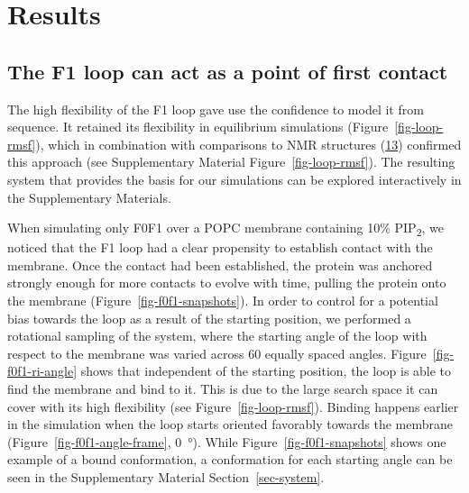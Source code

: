\documentclass[
  twocolumn]{biophys-new-mod}
\begin{document}
\hypertarget{results}{%
\section{Results}\label{results}}

\hypertarget{the-f1-loop-can-act-as-a-point-of-first-contact}{%
\subsection{The F1 loop can act as a point of first
contact}\label{the-f1-loop-can-act-as-a-point-of-first-contact}}

The high flexibility of the F1 loop gave use the confidence to model it
from sequence. It retained its flexibility in equilibrium simulations
(Figure~\ref{fig-loop-rmsf}), which in combination with comparisons to
NMR structures
(\protect\hyperlink{ref-goultStructureDoubleUbiquitinlike2010}{13})
confirmed this approach (see Supplementary Material
Figure~\ref{fig-loop-rmsf}). The resulting system that provides the
basis for our simulations can be explored interactively in the
Supplementary Materials.

When simulating only F0F1 over a POPC membrane containing 10\%
PIP\textsubscript{2}, we noticed that the F1 loop had a clear propensity
to establish contact with the membrane. Once the contact had been
established, the protein was anchored strongly enough for more contacts
to evolve with time, pulling the protein onto the membrane
(Figure~\ref{fig-f0f1-snapshots}). In order to control for a potential
bias towards the loop as a result of the starting position, we performed
a rotational sampling of the system, where the starting angle of the
loop with respect to the membrane was varied across 60 equally spaced
angles. Figure~\ref{fig-f0f1-ri-angle} shows that independent of the
starting position, the loop is able to find the membrane and bind to it.
This is due to the large search space it can cover with its high
flexibility (see Figure~\ref{fig-loop-rmsf}). Binding happens earlier in
the simulation when the loop starts oriented favorably towards the
membrane (Figure~\ref{fig-f0f1-angle-frame}, 0~°). While
Figure~\ref{fig-f0f1-snapshots} shows one example of a bound
conformation, a conformation for each starting angle can be seen in the
Supplementary Material Section~\ref{sec-system}.
\end{document}
